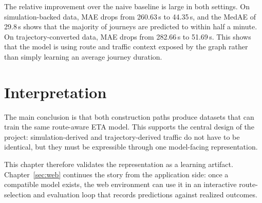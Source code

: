 \begin{sloppypar}
The relative improvement over the naive baseline is large in both settings. On simulation-backed data, MAE drops from 260.63\,s to 44.35\,s, and the MedAE of 29.8\,s shows that the majority of journeys are predicted to within half a minute. On trajectory-converted data, MAE drops from 282.66\,s to 51.69\,s. This shows that the model is using route and traffic context exposed by the graph rather than simply learning an average journey duration.
\end{sloppypar}

\section{Interpretation}
The main conclusion is that both construction paths produce datasets that can train the same route-aware ETA model. This supports the central design of the project: simulation-derived and trajectory-derived traffic do not have to be identical, but they must be expressible through one model-facing representation.

This chapter therefore validates the representation as a learning artifact. Chapter~\ref{sec:web} continues the story from the application side: once a compatible model exists, the web environment can use it in an interactive route-selection and evaluation loop that records predictions against realized outcomes.

\FloatBarrier
